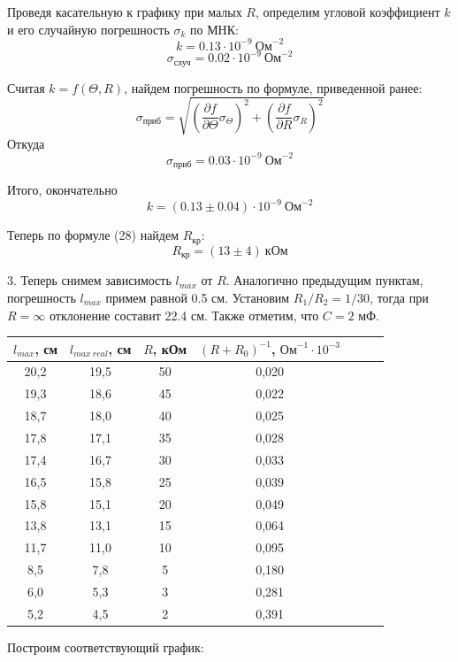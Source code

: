 \documentclass[14pt]{article}
\begin{document}
\vspace{1cm}
Проведя касательную к графику при малых $R$, определим угловой коэффициент $k$ и его случайную погрешность $\sigma_k$ по МНК:
$$
	k = 0.13 \cdot 10^{-9}~\text{Ом}^{-2}
$$
$$
	\sigma_{\text{случ}} = 0.02 \cdot 10^{-9}~\text{Ом}^{-2}
$$

Считая $k = f(\Theta, R)$, найдем погрешность по формуле, приведенной ранее:
$$
	\sigma_{\text{приб}} = \sqrt{\left(\frac{\partial f}{\partial \Theta}\sigma_\Theta\right)^2 + \left(\frac{\partial f}{\partial R}\sigma_R\right)^2}
$$
Откуда
$$
	\sigma_{\text{приб}} = 0.03 \cdot 10^{-9}~\text{Ом}^{-2}
$$

Итого, окончательно
$$
	k = (0.13 \pm 0.04) \cdot 10^{-9}~\text{Ом}^{-2}
$$

\vspace{1cm}
Теперь по формуле (28) найдем $R_\text{кр}$:
$$
	R_\text{кр} = (13 \pm 4)~\text{кОм}
$$

\vspace{1cm}
3. Теперь снимем зависимость $l_{max}$ от $R$. Аналогично предыдущим пунктам, погрешность $l_{max}$ примем равной 0.5 см. Установим $R_1/R_2 = 1/30$, тогда при $R = \infty$ отклонение составит 22.4 см. Также отметим, что $C = 2$ мФ.

\begin{center}
\begin{tabular}{|c|c|c|c|c|c|c|}
\hline
$l_{max}$, см&$l_{max~real}$, см&$R$, кОм&$(R+R_0)^{-1}$, $\text{Ом}^{-1}\cdot10^{-3}$\\
\hline
20,2&19,5&50&0,020\\
\hline
19,3&18,6&45&0,022\\
\hline
18,7&18,0&40&0,025\\
\hline
17,8&17,1&35&0,028\\
\hline
17,4&16,7&30&0,033\\
\hline
16,5&15,8&25&0,039\\
\hline
15,8&15,1&20&0,049\\
\hline
13,8&13,1&15&0,064\\
\hline
11,7&11,0&10&0,095\\
\hline
8,5&7,8&5&0,180\\
\hline
6,0&5,3&3&0,281\\
\hline
5,2&4,5&2&0,391\\
\hline
\end{tabular}
\end{center}

Построим соответствующий график:
\end{document}
